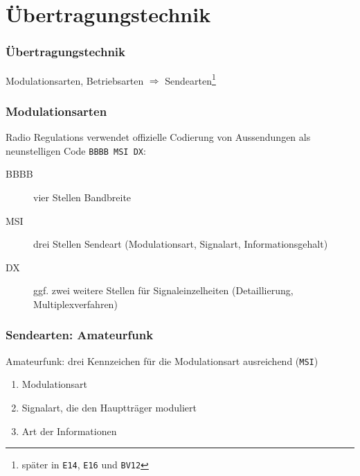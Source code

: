 \section[Übertra\-gungs\-technik]{Übertragungstechnik}

\begin{frame}
  \frametitle{Übertragungstechnik}

  \begin{center}
    Modulationsarten, Betriebsarten $\Rightarrow$ Sendearten\footnote{später
    in \texttt{E14}, \texttt{E16} und \texttt{BV12}}
  \end{center}

\end{frame}

\begin{frame}
  \frametitle{Modulationsarten}

  Radio Regulations verwendet offizielle Codierung von Aussendungen als
  neunstelligen Code \texttt{BBBB\,MSI\,DX}: \\[2em]

  \begin{description}
    \item[BBBB] vier Stellen Bandbreite
    \item[MSI] drei Stellen Sendeart (Modulationsart, Signalart,
      Informationsgehalt)
    \item[DX] ggf. zwei weitere Stellen für Signaleinzelheiten
      (Detaillierung, Multiplexverfahren)
  \end{description}

\end{frame}

\begin{frame}
  \frametitle{Sendearten: Amateurfunk}

  Amateurfunk: drei Kennzeichen für die Modulationsart ausreichend (\texttt{MSI})

  \begin{enumerate}
    \item Modulationsart
    \item Signalart, die den Hauptträger moduliert
    \item Art der Informationen
  \end{enumerate}


\end{frame}

